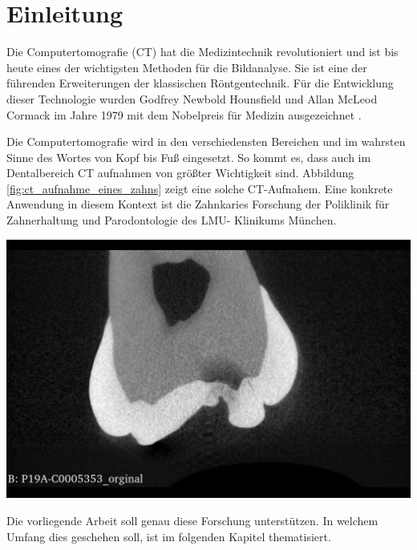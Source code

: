 \chapter{Einleitung}
\label{chap:einleitung} Die Computertomografie (CT) hat die Medizintechnik revolutioniert
und ist bis heute eines der wichtigsten Methoden für die Bildanalyse. Sie ist
eine der führenden Erweiterungen der klassischen Röntgentechnik. Für die Entwicklung
dieser Technologie wurden Godfrey Newbold Hounsfield und Allan McLeod Cormack im
Jahre 1979 mit dem Nobelpreis für Medizin ausgezeichnet \citep[Seite12]{handels2000}.

\begin{minipage}{0.40\textwidth}
	Die Computertomografie wird in den verschiedensten Bereichen und im wahrsten Sinne
	des Wortes von Kopf bis Fuß eingesetzt. So kommt es, dass auch im Dentalbereich
	CT aufnahmen von größter Wichtigkeit sind. Abbildung
	\ref{fig:ct_aufnahme_eines_zahns} zeigt eine solche CT-Aufnahem. Eine konkrete
	Anwendung in diesem Kontext ist die Zahnkaries Forschung der Poliklinik für Zahnerhaltung
	und Parodontologie des LMU- Klinikums München.
\end{minipage}
\hfill
\begin{minipage}{0.50\textwidth}
	\centering
	\includegraphics[scale=0.2, width=\textwidth]{img/micro_ct_orginal.jpg}
	 \label{fig:ct_aufnahme_eines_zahns}
\end{minipage}

Die vorliegende Arbeit soll genau diese Forschung unterstützen. In welchem Umfang
dies geschehen soll, ist im folgenden Kapitel thematisiert.

